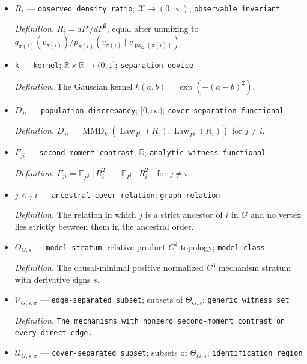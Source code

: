 \documentclass{article}
\begin{document}
\begin{itemize}
  \par\smallskip\noindent\emph{Definition.} The pullback of \(G\) by \(\pi\), so \(j\to i\) in \(G^\pi\) exactly when \(\pi(j)\to\pi(i)\) in \(G\).
  \item \(R_i\) --- \texttt{observed density ratio}; \(\mathcal X\to(0,\infty)\); \texttt{observable invariant}
  \par\smallskip\noindent\emph{Definition.} \(R_i=dP^i/dP^0\), equal after unmixing to \(q_{\pi(i)}(v_{\pi(i)})/p_{\pi(i)}(v_{\pi(i)}\mid v_{\operatorname{pa}_G(\pi(i))})\).
  \item \texttt{k} --- \texttt{kernel}; \(\mathbb R\times\mathbb R\to(0,1]\); \texttt{separation device}
  \par\smallskip\noindent\emph{Definition.} The Gaussian kernel \(k(a,b)=\exp(-(a-b)^2)\).
  \item \(D_{ji}\) --- \texttt{population discrepancy}; \([0,\infty)\); \texttt{cover-\allowbreak{}separation functional}
  \par\smallskip\noindent\emph{Definition.} \(D_{ji}=\operatorname{MMD}_k(\operatorname{Law}_{P^0}(R_i),\operatorname{Law}_{P^j}(R_i))\) for \(j\ne i\).
  \item \(F_{ji}\) --- \texttt{second-\allowbreak{}moment contrast}; \(\mathbb R\); \texttt{analytic witness functional}
  \par\smallskip\noindent\emph{Definition.} \(F_{ji}=\mathbb E_{P^j}[R_i^2]-\mathbb E_{P^0}[R_i^2]\) for \(j\ne i\).
  \item \(j\lessdot_G i\) --- \texttt{ancestral cover relation}; \texttt{graph relation}
  \par\smallskip\noindent\emph{Definition.} The relation in which \(j\) is a strict ancestor of \(i\) in \(G\) and no vertex lies strictly between them in the ancestral order.
  \item \(\Theta_{G,s}\) --- \texttt{model stratum}; relative product \(C^2\) topology; \texttt{model class}
  \par\smallskip\noindent\emph{Definition.} The causal-minimal positive normalized \(C^3\) mechanism stratum with derivative signs \(s\).
  \item \(\mathcal V_{G,s,\pi}\) --- \texttt{edge-\allowbreak{}separated subset}; subsets of \(\Theta_{G,s}\); \texttt{generic witness set}
  \par\smallskip\noindent\emph{Definition.} \texttt{The mechanisms with nonzero second-\allowbreak{}moment contrast on every direct edge.}
  \item \(\mathcal U_{G,s,\pi}\) --- \texttt{cover-\allowbreak{}separated subset}; subsets of \(\Theta_{G,s}\); \texttt{identification region}

\end{itemize}
\end{document}
